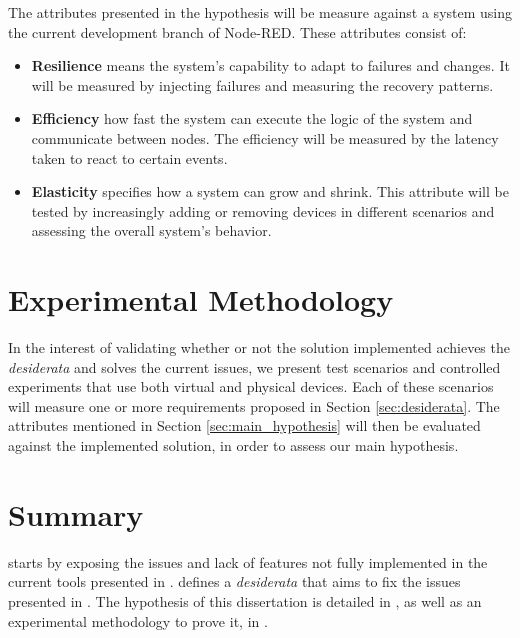The attributes presented in the hypothesis will be measure against a system using the current development branch of Node-RED. These attributes consist of:

\begin{itemize}
    \item \textbf{Resilience} means the system's capability to adapt to failures and changes. It will be measured by injecting failures and measuring the recovery patterns.
    \item \textbf{Efficiency} how fast the system can execute the logic of the system and communicate between nodes. The efficiency will be measured by the latency taken to react to certain events.
    \item \textbf{Elasticity} specifies how a system can grow and shrink. This attribute will be tested by increasingly adding or removing devices in different scenarios and assessing the overall system's behavior.
\end{itemize}

\section{Experimental Methodology}\label{sec:exp_meth}

In the interest of validating whether or not the solution implemented achieves the \emph{desiderata} and solves the current issues, we present test scenarios and controlled experiments that use both virtual and physical devices. Each of these scenarios will measure one or more requirements proposed in Section \ref{sec:desiderata}. The attributes mentioned in Section \ref{sec:main_hypothesis} will then be evaluated against the implemented solution, in order to assess our main hypothesis.

\section{Summary}\label{sec:stat_summary}

 starts by exposing the issues and lack of features not fully implemented in the current tools presented in .  defines a \textit{desiderata} that aims to fix the issues presented in . The hypothesis of this dissertation is detailed in , as well as an experimental methodology to prove it, in .

